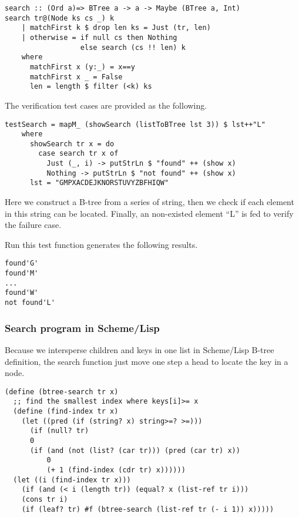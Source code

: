 \documentclass{article}
\begin{document}
\lstset{language=C++}
\begin{lstlisting}
search :: (Ord a)=> BTree a -> a -> Maybe (BTree a, Int)
search tr@(Node ks cs _) k
    | matchFirst k $ drop len ks = Just (tr, len)
    | otherwise = if null cs then Nothing
                  else search (cs !! len) k
    where
      matchFirst x (y:_) = x==y
      matchFirst x _ = False
      len = length $ filter (<k) ks
\end{lstlisting}

The verification test cases are provided as the following.

\begin{lstlisting}
testSearch = mapM_ (showSearch (listToBTree lst 3)) $ lst++"L"
    where
      showSearch tr x = do
        case search tr x of
          Just (_, i) -> putStrLn $ "found" ++ (show x)
          Nothing -> putStrLn $ "not found" ++ (show x)
      lst = "GMPXACDEJKNORSTUVYZBFHIQW"
\end{lstlisting} %

Here we construct a B-tree from a series of string, then
we check if each element in this string can be located.
Finally, an non-existed element ``L'' is fed to verify the
failure case.

Run this test function generates the following results.

\begin{verbatim}
found'G'
found'M'
...
found'W'
not found'L'
\end{verbatim}

\subsubsection*{Search program in Scheme/Lisp}
Because we intersperse children and keys in one list in
Scheme/Lisp B-tree definition, the search function just
move one step a head to locate the key in a node.

\lstset{language=lisp}
\begin{lstlisting}
(define (btree-search tr x)
  ;; find the smallest index where keys[i]>= x
  (define (find-index tr x)
    (let ((pred (if (string? x) string>=? >=)))
      (if (null? tr)
	  0
	  (if (and (not (list? (car tr))) (pred (car tr) x))
	      0
	      (+ 1 (find-index (cdr tr) x))))))
  (let ((i (find-index tr x)))
    (if (and (< i (length tr)) (equal? x (list-ref tr i)))
	(cons tr i)
	(if (leaf? tr) #f (btree-search (list-ref tr (- i 1)) x)))))
\end{lstlisting}
\end{document}
